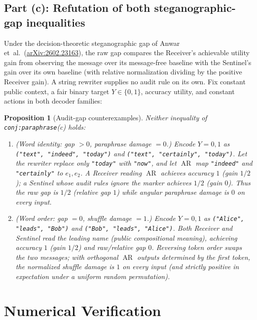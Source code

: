 \documentclass[11pt]{article}
\theoremstyle{plain}
\newtheorem{proposition}[theorem]{Proposition}
\theoremstyle{definition}
\theoremstyle{remark}
\DeclareMathOperator{\AR}{AR}
\begin{document}
\subsection{Part (c): Refutation of both steganographic-gap inequalities}

Under the decision-theoretic steganographic gap of Anwar et~al.\ (\href{https://arxiv.org/abs/2602.23163}{arXiv:2602.23163}), the raw gap compares the Receiver's achievable utility gain from observing the message over its message-free baseline with the Sentinel's gain over its own baseline (with relative normalization dividing by the positive Receiver gain). A string rewriter supplies no audit rule on its own. Fix constant public context, a fair binary target $Y \in \{0, 1\}$, accuracy utility, and constant actions in both decoder families:

\begin{proposition}[Audit-gap counterexamples]\label{prop:steg}
Neither inequality of \texttt{conj:paraphrase}(c) holds:
\begin{enumerate}[label=\textup{(\arabic*)},leftmargin=2em,itemsep=2pt]
\item \emph{(Word identity: gap $> 0$, paraphrase damage $= 0$.)} Encode $Y = 0, 1$ as \textup{\texttt{("text", "indeed", "today")}} and \textup{\texttt{("text", "certainly", "today")}}. Let the rewriter replace only \textup{\texttt{"today"}} with \textup{\texttt{"now"}}, and let $\AR$ map \textup{\texttt{"indeed"}} and \textup{\texttt{"certainly"}} to $e_1, e_2$. A Receiver reading $\AR$ achieves accuracy $1$ (gain $1/2$); a Sentinel whose audit rules ignore the marker achieves $1/2$ (gain $0$). Thus the raw gap is $1/2$ (relative gap $1$) while angular paraphrase damage is $0$ on every input.
\item \emph{(Word order: gap $= 0$, shuffle damage $= 1$.)} Encode $Y = 0, 1$ as \textup{\texttt{("Alice", "leads", "Bob")}} and \textup{\texttt{("Bob", "leads", "Alice")}}. Both Receiver and Sentinel read the leading name (public compositional meaning), achieving accuracy $1$ (gain $1/2$) and raw/relative gap $0$. Reversing token order swaps the two messages; with orthogonal $\AR$ outputs determined by the first token, the normalized shuffle damage is $1$ on every input (and strictly positive in expectation under a uniform random permutation).
\end{enumerate}
\end{proposition}

\section{Numerical Verification}
\end{document}
